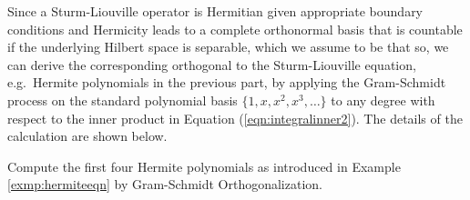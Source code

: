 Since a Sturm-Liouville operator is Hermitian given appropriate boundary conditions and Hermicity leads to a complete orthonormal basis that is countable if the underlying Hilbert space is separable, which we assume to be that so, we can derive the corresponding orthogonal  to the Sturm-Liouville equation, e.g.\ Hermite polynomials in the previous part, by applying the Gram-Schmidt process on the standard polynomial basis $\{1, x, x^2, x^3, \ldots\}$ to any degree with respect to the inner product in Equation (\ref{eqn:integralinner2}). The details of the calculation are shown below.
\begin{exmp}
Compute the first four Hermite polynomials as introduced in Example \ref{exmp:hermiteeqn} by Gram-Schmidt Orthogonalization.
\end{exmp}
